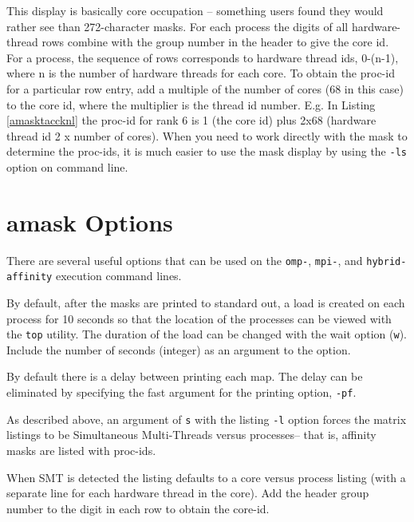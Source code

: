 \documentclass[10pt,a4paper]{report}
\begin{document}
This display is basically core occupation -- something users found they would rather see than 272-character masks.
For each process the digits of all hardware-thread rows combine with the  group number in the header to give the
core id. For a process, the sequence of rows corresponds to hardware thread ids, 0-(n-1), where n is the number of hardware 
threads for each core. To obtain the proc-id for a particular row entry, add a multiple of the number of cores (68 in this case)
to the core id, where the multiplier is the thread id number.  E.g. In Listing \ref{amasktaccknl} the proc-id for rank 6 is 1 (the core id)
plus 2x68 (hardware thread id 2 x number of cores). 
When you need to work directly with the mask to determine the proc-ids, it is much easier 
to use the mask display by using the \verb+-ls+ option on command line. 

\clearpage



\section{amask Options}
There are several useful options that can be used on the \verb+omp-+, \verb+mpi-+, and
\verb+hybrid-affinity+ execution command lines.  

By default, after the masks are printed to standard out, a load is created on each process
for 10 seconds so that the location of the processes can be viewed with the \verb+top+ 
utility. The duration of the load can be changed with the wait option (\verb+w+). Include
the number of seconds (integer) as an argument to the option. 

By default there is a delay between printing each map. The delay can be eliminated by specifying
the fast argument for the printing option, \verb+-pf+.


As described above, an argument of \verb+s+ with the listing \verb+-l+ option forces the 
matrix listings to be Simultaneous Multi-Threads versus
processes-- that is, affinity masks are listed with proc-ids. 

When SMT is detected the listing defaults to a core versus process listing (with a
separate line for each hardware thread in the core).  
Add the header group number to the digit in each row to obtain the core-id.
\end{document}
